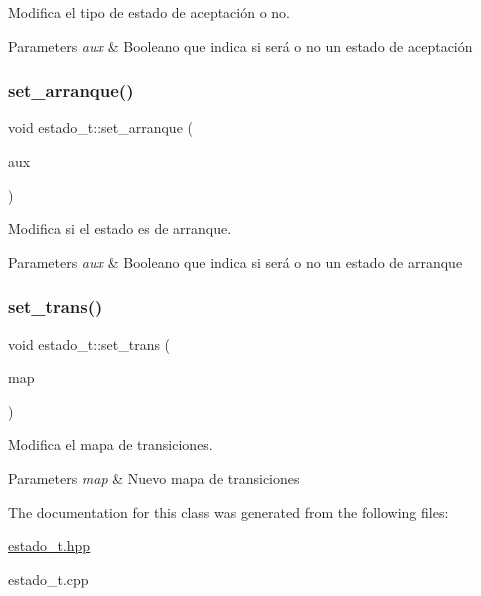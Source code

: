 Modifica el tipo de estado de aceptación o no. 


\begin{DoxyParams}{Parameters}
{\em aux} & Booleano que indica si será o no un estado de aceptación \\
\hline
\end{DoxyParams}
\mbox{\label{classestado__t_a2121978a91821e553cedd8f7f0c1c71c}} 
\subsubsection{\texorpdfstring{set\+\_\+arranque()}{set\_arranque()}}
{\footnotesize\ttfamily void estado\+\_\+t\+::set\+\_\+arranque (\begin{DoxyParamCaption}\item[{bool}]{aux }\end{DoxyParamCaption})\hspace{0.3cm}{\ttfamily [inline]}}



Modifica si el estado es de arranque. 


\begin{DoxyParams}{Parameters}
{\em aux} & Booleano que indica si será o no un estado de arranque \\
\hline
\end{DoxyParams}
\mbox{\label{classestado__t_a387cecb303d45faa2c7b3a4a5806bc5b}} 
\subsubsection{\texorpdfstring{set\+\_\+trans()}{set\_trans()}}
{\footnotesize\ttfamily void estado\+\_\+t\+::set\+\_\+trans (\begin{DoxyParamCaption}\item[{trans\+\_\+map}]{map }\end{DoxyParamCaption})\hspace{0.3cm}{\ttfamily [inline]}}



Modifica el mapa de transiciones. 


\begin{DoxyParams}{Parameters}
{\em map} & Nuevo mapa de transiciones \\
\hline
\end{DoxyParams}


The documentation for this class was generated from the following files\+:\begin{DoxyCompactItemize}
\item 
\hyperlink{estado__t_8hpp}{estado\+\_\+t.\+hpp}\item 
estado\+\_\+t.\+cpp\end{DoxyCompactItemize}
